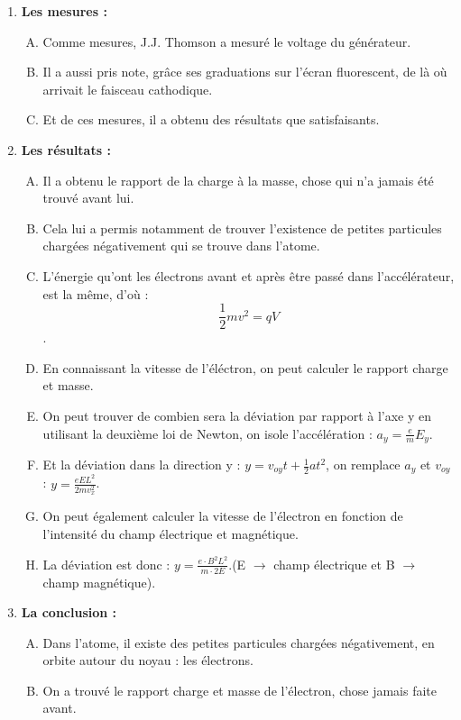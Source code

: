 \documentclass[../main.tex]{subfiles}
\begin{document}
\begin{enumerate}[I]
\begin{enumerate}[A. ]
    \end{enumerate}
    \item \textbf{Les mesures :}
    \begin{enumerate}[A. ]
        \item Comme mesures, J.J. Thomson a mesuré le voltage du générateur.
        \item Il a aussi pris note, grâce ses graduations sur l'écran fluorescent, de là où arrivait le faisceau cathodique.
        \item Et de ces mesures, il a obtenu des résultats que satisfaisants.
    \end{enumerate}
    \item \textbf {Les résultats :}
    \begin{enumerate}[A. ]
        \item Il a obtenu le rapport de la charge à la masse, chose qui n'a jamais été trouvé avant lui.
        \item Cela lui a permis notamment de trouver l'existence de petites particules chargées négativement qui se trouve dans l'atome. 
        \item L'énergie qu'ont les électrons avant et après être passé dans l'accélérateur, est la même, d'où : $$\frac{1}{2}mv^2 = qV$$.
        \item En connaissant la vitesse de l'éléctron, on peut calculer le rapport charge et masse.
        \item On peut trouver de combien sera la déviation par rapport à l'axe y en utilisant la deuxième loi de Newton, on isole l'accélération : $a_y = \frac{e}{m}E_y$.
        \item Et la déviation dans la direction y : $y = v_{oy}t + \frac{1}{2}at^2$, on remplace $a_y$ et $v_{oy}$ : $y = \frac{eEL^2}{2mv_x^2}$.
        \item On peut également calculer la vitesse de l'électron en fonction de l'intensité du champ électrique et magnétique.
        \item La déviation est donc : $y = \frac{e \cdot B^2L^2}{m \cdot 2E}$.(E $\rightarrow$ champ électrique et B $\rightarrow$ champ magnétique).
    \end{enumerate}
    \item \textbf {La conclusion :}
    \begin{enumerate}[A. ]
        \item Dans l'atome, il existe des petites particules chargées négativement, en orbite autour du noyau : les électrons.
        \item On a trouvé le rapport charge et masse de l'électron, chose jamais faite avant.

\end{enumerate}
\end{enumerate}
\end{document}
